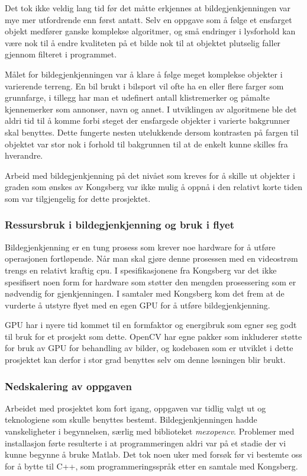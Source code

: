 Det tok ikke veldig lang tid før det måtte erkjennes at bildegjenkjenningen var mye mer utfordrende enn først antatt. Selv en oppgave som å følge et ensfarget objekt medfører ganske komplekse algoritmer, og små endringer i lysforhold kan være nok til å endre kvaliteten på et bilde nok til at objektet plutselig faller gjennom filteret i programmet.

Målet for bildegjenkjenningen var å klare å følge meget komplekse objekter i varierende terreng. En bil brukt i bilsport vil ofte ha en eller flere farger som grunnfarge, i tillegg har man et udefinert antall klistremerker og påmalte kjennemerker som annonser, navn og annet. I utviklingen av algoritmene ble det aldri tid til å komme forbi steget der ensfargede objekter i varierte bakgrunner skal benyttes. Dette fungerte nesten utelukkende dersom kontrasten på fargen til objektet var stor nok i forhold til bakgrunnen til at de enkelt kunne skilles fra hverandre.

Arbeid med bildegjenkjenning på det nivået som kreves for å skille ut objekter i graden som ønskes av Kongsberg var ikke mulig å oppnå i den relativt korte tiden som var tilgjengelig for dette prosjektet.


\subsubsection{Ressursbruk i bildegjenkjenning og bruk i flyet}

Bildegjenkjenning er en tung prosess som krever noe hardware for å utføre operasjonen fortløpende. Når man skal gjøre denne prosessen med en videostrøm trengs en relativt kraftig cpu. I spesifikasjonene fra Kongsberg \cite{LocalHawkPDF} var det ikke spesifisert noen form for hardware som støtter den mengden prosessering som er nødvendig for gjenkjenningen. I samtaler med Kongsberg kom det frem at de vurderte å utstyre flyet med en egen GPU for å utføre bildegjenkjenning. 

GPU har i nyere tid kommet til en formfaktor og energibruk som egner seg godt til bruk for et prosjekt som dette. OpenCV har egne pakker som inkluderer støtte for bruk av GPU for behandling av bilder, og kodebasen som er utviklet i dette prosjektet kan derfor i stor grad benyttes selv om denne løsningen blir brukt.

\subsubsection{Nedskalering av oppgaven}
Arbeidet med prosjektet kom fort igang, oppgaven var tidlig valgt ut og teknologiene som skulle benyttes bestemt. Bildegjenkjenningen hadde vanskeligheter i begynnelsen, særlig med biblioteket \emph{mexopencv}. Problemer med installasjon førte resulterte i at programmeringen aldri var på et stadie der vi kunne begynne å bruke Matlab. Det tok noen uker med forsøk før vi bestemte oss for å bytte til C++, som programmeringsspråk etter en samtale med Kongsberg.

